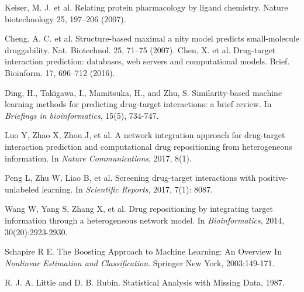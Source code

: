 \documentclass[journal]{IEEEtran}
\begin{document}
%
%
%
\begin{thebibliography}{10}

Keiser, M. J. et al. Relating protein pharmacology by ligand chemistry. Nature biotechnology 25, 197–206 (2007).

Cheng, A. C. et al. Structure-based maximal a nity model predicts small-molecule druggability. Nat. Biotechnol. 25, 71–75 (2007).
Chen, X. et al. Drug-target interaction prediction: databases, web servers and computational models. Brief. Bioinform. 17, 696–712 (2016).

Ding, H., Takigawa, I., Mamitsuka, H., and Zhu, S.
\newblock Similarity-based machine learning methods for predicting drug-target interactions: a brief review. \newblock In {\em Briefings in bioinformatics}, 15(5), 734-747.


Luo Y, Zhao X, Zhou J, et al.
\newblock A network integration approach for drug-target interaction prediction and computational drug repositioning from heterogeneous information.
\newblock In {\em Nature Communications}, 2017, 8(1).


Peng L, Zhu W, Liao B, et al.
\newblock Screening drug-target interactions with positive-unlabeled learning.
\newblock In {\em Scientific Reports}, 2017, 7(1): 8087.

Wang W, Yang S, Zhang X, et al. 
\newblock Drug repositioning by integrating target information through a heterogeneous network model. 
\newblock In {\em Bioinformatics}, 2014, 30(20):2923-2930.



Schapire R E. 
\newblock The Boosting Approach to Machine Learning: An Overview
\newblock In {\em Nonlinear Estimation and Classification}. Springer New York, 2003:149-171.

R. J. A. Little and D. B. Rubin.
\newblock Statistical Analysis with Missing Data, 1987.


\end{thebibliography}
\end{document}

